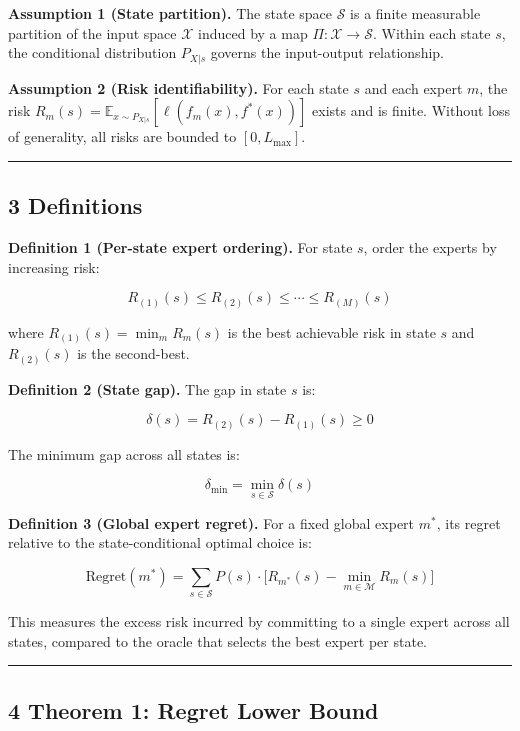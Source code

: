 \documentclass[
  12pt,
]{article}
\begin{document}
\textbf{Assumption 1 (State partition).} The state space \(\mathcal{S}\)
is a finite measurable partition of the input space \(\mathcal{X}\)
induced by a map \(\Pi: \mathcal{X} \to \mathcal{S}\). Within each state
\(s\), the conditional distribution \(P_{X|s}\) governs the input-output
relationship.

\textbf{Assumption 2 (Risk identifiability).} For each state \(s\) and
each expert \(m\), the risk
\(R_m(s) = \mathbb{E}_{x \sim P_{X|s}}[\ell(f_m(x), f^*(x))]\) exists
and is finite. Without loss of generality, all risks are bounded to
\([0, L_{\max}]\).

\begin{center}\rule{0.5\linewidth}{0.5pt}\end{center}

\subsection{3 Definitions}\label{definitions}

\textbf{Definition 1 (Per-state expert ordering).} For state \(s\),
order the experts by increasing risk:

\[R_{(1)}(s) \leq R_{(2)}(s) \leq \cdots \leq R_{(M)}(s)\]

where \(R_{(1)}(s) = \min_{m} R_m(s)\) is the best achievable risk in
state \(s\) and \(R_{(2)}(s)\) is the second-best.

\textbf{Definition 2 (State gap).} The gap in state \(s\) is:

\[\delta(s) = R_{(2)}(s) - R_{(1)}(s) \geq 0\]

The minimum gap across all states is:

\[\delta_{\min} = \min_{s \in \mathcal{S}} \delta(s)\]

\textbf{Definition 3 (Global expert regret).} For a fixed global expert
\(m^*\), its regret relative to the state-conditional optimal choice is:

\[\text{Regret}(m^*) = \sum_{s \in \mathcal{S}} P(s) \cdot \bigl[R_{m^*}(s) - \min_{m \in \mathcal{M}} R_m(s)\bigr]\]

This measures the excess risk incurred by committing to a single expert
across all states, compared to the oracle that selects the best expert
per state.

\begin{center}\rule{0.5\linewidth}{0.5pt}\end{center}

\subsection{4 Theorem 1: Regret Lower
Bound}\label{theorem-1-regret-lower-bound}
\end{document}
